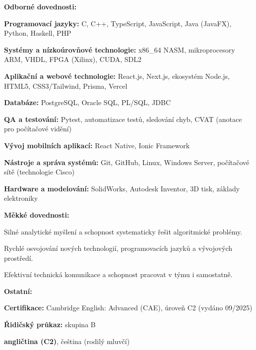 \documentclass[10pt,a4paper]{article}
\begin{document}
\hspace*{7pt}\textbf{Odborné dovednosti:}
\begin{cvlist}
  \item \textbf{Programovací jazyky:} C, C++, TypeScript, JavaScript, Java (JavaFX), Python, Haskell, PHP
  \item \textbf{Systémy a nízkoúrovňové technologie:} x86\_64 NASM, mikroprocesory ARM, VHDL, FPGA (Xilinx), CUDA, SDL2
  \item \textbf{Aplikační a webové technologie:} React.js, Next.js, ekosystém Node.js, HTML5, CSS3/Tailwind, Prisma, Vercel
  \item \textbf{Databáze:} PostgreSQL, Oracle SQL, PL/SQL, JDBC
  \item \textbf{QA a testování:} Pytest, automatizace testů, sledování chyb, CVAT (anotace pro počítačové vidění)
  \item \textbf{Vývoj mobilních aplikací:} React Native, Ionic Framework
  \item \textbf{Nástroje a správa systémů:} Git, GitHub, Linux, Windows Server, počítačové sítě (technologie Cisco)
  \item \textbf{Hardware a modelování:} SolidWorks, Autodesk Inventor, 3D tisk, základy elektroniky
\end{cvlist}

\hspace*{7pt}\textbf{Měkké dovednosti:}
\begin{cvlist}
  \item Silné analytické myšlení a schopnost systematicky řešit algoritmické problémy.
  \item Rychlé osvojování nových technologií, programovacích jazyků a vývojových prostředí.
  \item Efektivní technická komunikace a schopnost pracovat v týmu i samostatně.
\end{cvlist}

\hspace*{7pt}\textbf{Ostatní:}
\begin{cvlist}
  \item \textbf{Certifikace:} Cambridge English: Advanced (CAE), úroveň C2 (vydáno 09/2025)
  \item \textbf{Řidičský průkaz:} skupina B
\end{cvlist}

\textbf{angličtina (C2)}, čeština (rodilý mluvčí)
\end{document}

